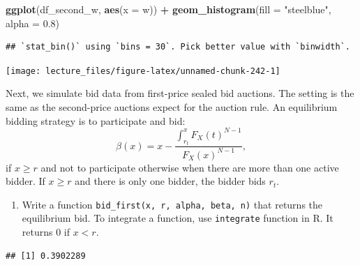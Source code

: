 \documentclass[]{book}
\newenvironment{Shaded}{\begin{snugshade}}{\end{snugshade}}
\newcommand{\KeywordTok}[1]{\textcolor[rgb]{0.13,0.29,0.53}{\textbf{#1}}}
\newcommand{\DataTypeTok}[1]{\textcolor[rgb]{0.13,0.29,0.53}{#1}}
\newcommand{\DecValTok}[1]{\textcolor[rgb]{0.00,0.00,0.81}{#1}}
\newcommand{\FloatTok}[1]{\textcolor[rgb]{0.00,0.00,0.81}{#1}}
\newcommand{\StringTok}[1]{\textcolor[rgb]{0.31,0.60,0.02}{#1}}
\newcommand{\CommentTok}[1]{\textcolor[rgb]{0.56,0.35,0.01}{\textit{#1}}}
\newcommand{\OperatorTok}[1]{\textcolor[rgb]{0.81,0.36,0.00}{\textbf{#1}}}
\newcommand{\NormalTok}[1]{#1}
\providecommand{\tightlist}{%
  \setlength{\itemsep}{0pt}\setlength{\parskip}{0pt}}
\begin{document}
\begin{Shaded}
\begin{Highlighting}[]
\KeywordTok{ggplot}\NormalTok{(df_second_w, }\KeywordTok{aes}\NormalTok{(}\DataTypeTok{x =}\NormalTok{ w)) }\OperatorTok{+}\StringTok{ }\KeywordTok{geom_histogram}\NormalTok{(}\DataTypeTok{fill =} \StringTok{"steelblue"}\NormalTok{, }\DataTypeTok{alpha =} \FloatTok{0.8}\NormalTok{)}
\end{Highlighting}
\end{Shaded}

\begin{verbatim}
## `stat_bin()` using `bins = 30`. Pick better value with `binwidth`.
\end{verbatim}

\begin{center}\texttt{[image: lecture\_files/figure-latex/unnamed-chunk-242-1]} \end{center}

Next, we simulate bid data from first-price sealed bid auctions. The
setting is the same as the second-price auctions expect for the auction
rule. An equilibrium bidding strategy is to participate and bid: \[
\beta(x) = x - \frac{\int_{r_t}^x F_X(t)^{N - 1}}{F_X(x)^{N - 1}},
\] if \(x \ge r\) and not to participate otherwise when there are more
than one active bidder. If \(x \ge r\) and there is only one bidder, the
bidder bids \(r_t\).

\begin{enumerate}
\def\labelenumi{\arabic{enumi}.}
\setcounter{enumi}{3}
\tightlist
\item
  Write a function \texttt{bid\_first(x,\ r,\ alpha,\ beta,\ n)} that
  returns the equilibrium bid. To integrate a function, use
  \texttt{integrate} function in R. It returns 0 if \(x < r\).
\end{enumerate}

\begin{Shaded}
\end{Shaded}

\begin{verbatim}
## [1] 0.3902289
\end{verbatim}
\end{document}
